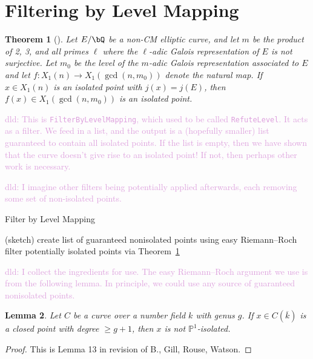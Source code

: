 \documentclass[11pt,reqno]{amsart}
\theoremstyle{plain}
\newtheorem{theorem}{Theorem}%
\newtheorem{lemma}[theorem]{Lemma}
\theoremstyle{definition}
\newcommand{\Q}{\bQ}
\newcommand{\dld}[1]{\textcolor{Plum}{dld: #1}}
\begin{document}
\section{Filtering by Level Mapping}

\begin{theorem}[\cite{BELOV}]\label{BELOVthm}
Let $E/\Q$ be a non-CM elliptic curve, and let $m$ be the product of 2, 3, and all primes $\ell$ where the $\ell$-adic Galois representation of $E$ is not surjective. Let $m_0$ be the level of the $m$-adic Galois representation associated to $E$ and let $f: X_1(n) \rightarrow X_1(\gcd(n,m_0))$ denote the natural map. If $x\in X_1(n)$ is an isolated point with $j(x)=j(E)$, then $f(x)\in X_1(\gcd(n,m_0))$ is an isolated point.
\end{theorem}

\dld{This is \texttt{FilterByLevelMapping}, which used to be called
\texttt{RefuteLevel}. It acts as a filter. We feed in a list, and the output is
a (hopefully smaller) list guaranteed to contain all isolated points. If the
list is empty, then we have shown that the curve doesn't give rise to an
isolated point! If not, then perhaps other work is necessary.}

\dld{I imagine other filters being potentially applied afterwards, each
removing some set of non-isolated points.}

\begin{algorithm}[H]\caption{Filter by Level Mapping}\label{alg:level_mapping}
  (sketch)\;
  create list of guaranteed nonisolated points using easy Riemann--Roch\;
  filter potentially isolated points via Theorem~\ref{BELOVthm}\;
\end{algorithm}

\dld{I collect the ingredients for use. The easy Riemann--Roch argument we use
is from the following lemma. In principle, we could use any source of
guaranteed nonisolated points.}

\begin{lemma}
Let $C$ be a curve over a number field $k$ with genus $g$. If $x \in C(\overline{k})$ is a closed point with degree
$\geq g+1$, then $x$ is not $\mathbb{P}^{1}$-isolated.
\end{lemma}

\begin{proof}
This is Lemma 13 in revision of B., Gill, Rouse, Watson.
\end{proof}
\end{document}
